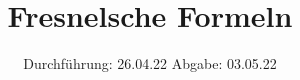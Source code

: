 

\subject{V407}
\title{Fresnelsche Formeln}
\date{
  Durchführung: 26.04.22
  \hspace{3em}
  Abgabe: 03.05.22
}



\maketitle
\thispagestyle{empty}
\tableofcontents
\newpage








\newpage
\printbibliography{}
\nocite{matplotlib}
\nocite{numpy}
\nocite{scipy}
\nocite{uncertainties}
\nocite{reback2020pandas}


